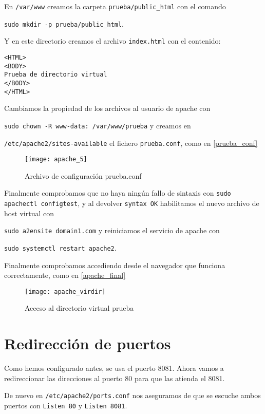 En \verb|/var/www| creamos la carpeta \verb|prueba/public_html| con el comando 

\verb|sudo mkdir -p prueba/public_html|.

Y en este directorio creamos el archivo \verb|index.html| con el contenido:

\begin{verbatim}
<HTML>
<BODY>
Prueba de directorio virtual
</BODY>
</HTML>
\end{verbatim}

Cambiamos la propiedad de los archivos al usuario de apache con 

\verb|sudo chown -R www-data: /var/www/prueba| y creamos en 

\verb|/etc/apache2/sites-available| el fichero \verb|prueba.conf|, como en \eqref{prueba_conf}

\begin{figure}[h!]
\begin{center}
\caption{Archivo de configuración prueba.conf}
\label{prueba_conf}
\texttt{[image: apache\_5]}
\end{center}
\end{figure}

Finalmente comprobamos que no haya ningún fallo de sintaxis con \verb|sudo apachectl configtest|, y al devolver \verb|syntax OK|  habilitamos el nuevo archivo de host virtual con 

\verb|sudo a2ensite domain1.com| y reiniciamos el servicio de apache con 

\verb|sudo systemctl restart apache2|.

Finalmente comprobamos accediendo desde el navegador que funciona correctamente, como en \eqref{apache_final}

\begin{figure}[h!]
\begin{center}
\caption{Acceso al directorio virtual prueba}
\label{apache_final}
\texttt{[image: apache\_virdir]}
\end{center}
\end{figure}

\section{Redirección de puertos}

Como hemos configurado antes, se usa el puerto 8081. Ahora vamos a redireccionar las direcciones al puerto 80 para que las atienda el 8081.

De nuevo en \verb|/etc/apache2/ports.conf| nos aseguramos de que se escuche ambos puertos con \verb|Listen 80| y \verb|Listen 8081|.

